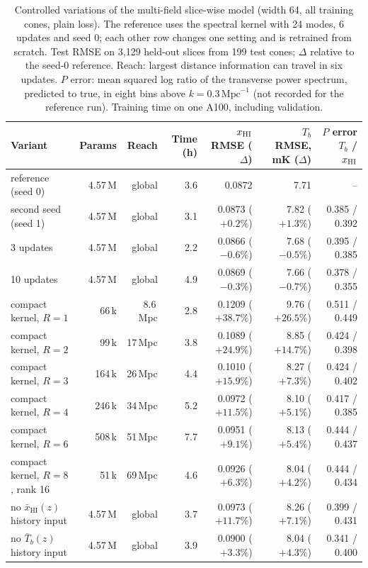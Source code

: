 \begin{table}[!tp]
  \centering
  \caption{Controlled variations of the multi-field slice-wise model (width 64, all training cones, plain loss). The reference uses the spectral kernel with 24 modes, 6 updates and seed 0; each other row changes one setting and is retrained from scratch. Test RMSE on 3,129 held-out slices from 199 test cones; $\Delta$ relative to the seed-0 reference. Reach: largest distance information can travel in six updates. $P$ error: mean squared log ratio of the transverse power spectrum, predicted to true, in eight bins above $k=0.3\,\mathrm{Mpc}^{-1}$ (not recorded for the reference run). Training time on one A100, including validation.}
  \label{tab:variations}
  \footnotesize
  \setlength{\tabcolsep}{4pt}
  \begin{tabular}{@{}lrrrrrr@{}}
    \toprule
    Variant & Params & Reach & Time (h) & $x_{\mathrm{HI}}$ RMSE ($\Delta$) & $T_b$ RMSE, mK ($\Delta$) & $P$ error $T_b$ / $x_{\mathrm{HI}}$ \\
    \midrule
    reference (seed 0) & 4.57\,M & global & 3.6 & 0.0872 & 7.71 & -- \\
    second seed (seed 1) & 4.57\,M & global & 3.1 & 0.0873 ($+0.2\%$) & 7.82 ($+1.3\%$) & 0.385 / 0.392 \\
    3 updates & 4.57\,M & global & 2.2 & 0.0866 ($-0.6\%$) & 7.68 ($-0.5\%$) & 0.395 / 0.385 \\
    10 updates & 4.57\,M & global & 4.9 & 0.0869 ($-0.3\%$) & 7.66 ($-0.7\%$) & 0.378 / 0.355 \\
    \midrule
    compact kernel, $R=1$ & 66\,k & 8.6\,Mpc & 2.8 & 0.1209 ($+38.7\%$) & 9.76 ($+26.5\%$) & 0.511 / 0.449 \\
    compact kernel, $R=2$ & 99\,k & 17\,Mpc & 3.8 & 0.1089 ($+24.9\%$) & 8.85 ($+14.7\%$) & 0.424 / 0.398 \\
    compact kernel, $R=3$ & 164\,k & 26\,Mpc & 4.4 & 0.1010 ($+15.9\%$) & 8.27 ($+7.3\%$) & 0.424 / 0.402 \\
    compact kernel, $R=4$ & 246\,k & 34\,Mpc & 5.2 & 0.0972 ($+11.5\%$) & 8.10 ($+5.1\%$) & 0.417 / 0.385 \\
    compact kernel, $R=6$ & 508\,k & 51\,Mpc & 7.7 & 0.0951 ($+9.1\%$) & 8.13 ($+5.4\%$) & 0.444 / 0.437 \\
    compact kernel, $R=8$, rank 16 & 51\,k & 69\,Mpc & 4.6 & 0.0926 ($+6.3\%$) & 8.04 ($+4.2\%$) & 0.444 / 0.434 \\
    \midrule
    no $\bar x_{\mathrm{HI}}(z)$ history input & 4.57\,M & global & 3.7 & 0.0973 ($+11.7\%$) & 8.26 ($+7.1\%$) & 0.399 / 0.431 \\
    no $\bar T_b(z)$ history input & 4.57\,M & global & 3.9 & 0.0900 ($+3.3\%$) & 8.04 ($+4.3\%$) & 0.341 / 0.400 \\
    \bottomrule
  \end{tabular}
\end{table}


